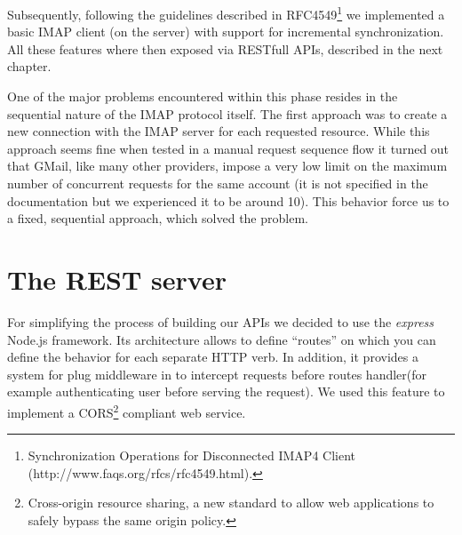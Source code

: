 \documentclass[a4paper,12pt]{report}
\begin{document}
Subsequently, following the guidelines described in RFC4549\footnote{Synchronization Operations for Disconnected IMAP4 Client (http://www.faqs.org/rfcs/rfc4549.html).} we implemented a basic IMAP client (on the server) with support for incremental synchronization. 
All these features where then exposed via RESTfull APIs, described in the next chapter.

One of the major problems encountered within this phase resides in the sequential nature of the IMAP protocol itself. The first approach was to create a new connection with the IMAP server for each requested resource. While this approach seems fine when tested in a manual request sequence flow it turned out that GMail, like many other providers, impose a very low limit on the maximum number of concurrent requests for the same account (it is not specified in the documentation but we experienced it to be around 10). This behavior force us to a fixed, sequential approach, which solved the problem.

\section{The REST server}
For simplifying the process of building our APIs we decided to use the \emph{express} Node.js framework.
Its architecture allows to define ``routes'' on which you can define the behavior for each separate HTTP verb. In addition, it provides a system for plug middleware in to intercept requests before routes handler(for example authenticating user before serving the request). We used this feature to implement a CORS\footnote{Cross-origin resource sharing, a new standard to allow web applications to safely bypass the same origin policy.} compliant web service.
\end{document}
